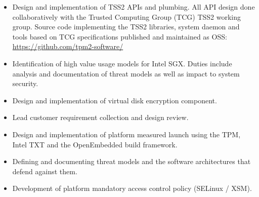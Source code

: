 \documentclass[letterpaper,11pt]{article}
\begin{document}
\begin {itemize}
  \setlength {\itemsep}{1pt}
  \setlength {\parskip}{0pt}
  \setlength {\parsep}{0pt}
  \item Design and implementation of TSS2 APIs and plumbing. All API
    design done collaboratively with the Trusted Computing Group (TCG)
    TSS2 working group. Source code implementing the TSS2 libraries,
    system daemon and tools based on TCG specifications published and
    maintained as OSS: \url{https://github.com/tpm2-software/}
  \item Identification of high value usage models for
    Intel\textsuperscript{\textregistered} SGX. Duties include analysis
    and documentation of threat models as well as impact to system
    security.
\end {itemize}

\begin {itemize}
  \setlength {\itemsep}{1pt}
  \setlength {\parskip}{0pt}
  \setlength {\parsep}{0pt}
  \item Design and implementation of virtual disk encryption component.
  \item Lead customer requirement collection and design review.
  \item Design and implementation of platform measured launch using the
    TPM, Intel\textsuperscript{\textregistered} TXT and the OpenEmbedded
    build framework.
  \item Defining and documenting threat models and the software
    architectures that defend against them.
  \item Development of platform mandatory access control policy (SELinux /
    XSM).
\end {itemize}
\end{document}
